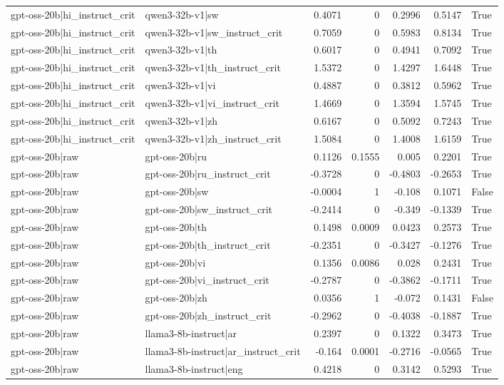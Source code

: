 \begin{table}
\begin{tabular}{l l r r r r l}
gpt-oss-20b|hi_instruct_crit & qwen3-32b-v1|sw & 0.4071 & 0 & 0.2996 & 0.5147 & True \\
gpt-oss-20b|hi_instruct_crit & qwen3-32b-v1|sw_instruct_crit & 0.7059 & 0 & 0.5983 & 0.8134 & True \\
gpt-oss-20b|hi_instruct_crit & qwen3-32b-v1|th & 0.6017 & 0 & 0.4941 & 0.7092 & True \\
gpt-oss-20b|hi_instruct_crit & qwen3-32b-v1|th_instruct_crit & 1.5372 & 0 & 1.4297 & 1.6448 & True \\
gpt-oss-20b|hi_instruct_crit & qwen3-32b-v1|vi & 0.4887 & 0 & 0.3812 & 0.5962 & True \\
gpt-oss-20b|hi_instruct_crit & qwen3-32b-v1|vi_instruct_crit & 1.4669 & 0 & 1.3594 & 1.5745 & True \\
gpt-oss-20b|hi_instruct_crit & qwen3-32b-v1|zh & 0.6167 & 0 & 0.5092 & 0.7243 & True \\
gpt-oss-20b|hi_instruct_crit & qwen3-32b-v1|zh_instruct_crit & 1.5084 & 0 & 1.4008 & 1.6159 & True \\
gpt-oss-20b|raw & gpt-oss-20b|ru & 0.1126 & 0.1555 & 0.005 & 0.2201 & True \\
gpt-oss-20b|raw & gpt-oss-20b|ru_instruct_crit & -0.3728 & 0 & -0.4803 & -0.2653 & True \\
gpt-oss-20b|raw & gpt-oss-20b|sw & -0.0004 & 1 & -0.108 & 0.1071 & False \\
gpt-oss-20b|raw & gpt-oss-20b|sw_instruct_crit & -0.2414 & 0 & -0.349 & -0.1339 & True \\
gpt-oss-20b|raw & gpt-oss-20b|th & 0.1498 & 0.0009 & 0.0423 & 0.2573 & True \\
gpt-oss-20b|raw & gpt-oss-20b|th_instruct_crit & -0.2351 & 0 & -0.3427 & -0.1276 & True \\
gpt-oss-20b|raw & gpt-oss-20b|vi & 0.1356 & 0.0086 & 0.028 & 0.2431 & True \\
gpt-oss-20b|raw & gpt-oss-20b|vi_instruct_crit & -0.2787 & 0 & -0.3862 & -0.1711 & True \\
gpt-oss-20b|raw & gpt-oss-20b|zh & 0.0356 & 1 & -0.072 & 0.1431 & False \\
gpt-oss-20b|raw & gpt-oss-20b|zh_instruct_crit & -0.2962 & 0 & -0.4038 & -0.1887 & True \\
gpt-oss-20b|raw & llama3-8b-instruct|ar & 0.2397 & 0 & 0.1322 & 0.3473 & True \\
gpt-oss-20b|raw & llama3-8b-instruct|ar_instruct_crit & -0.164 & 0.0001 & -0.2716 & -0.0565 & True \\
gpt-oss-20b|raw & llama3-8b-instruct|eng & 0.4218 & 0 & 0.3142 & 0.5293 & True \\

\end{tabular}
\end{table}
